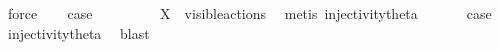 \begin{isabellebody}
\ force\isanewline
\ \ \isamarkupfalse%
\ {\isacharquery}{\kern0pt}case\ \isacommand{{\isachardot}{\kern0pt}{\isachardot}{\kern0pt}}\isamarkupfalse%
\isanewline
{}\isamarkupfalse%
\isanewline
\ \ \isamarkupfalse%
\ {}\isanewline
\ \ \isamarkupfalse%
\ {\isacartoucheopen}X\ {\isasymsubseteq}\ visible{\isacharunderscore}{\kern0pt}actions{\isacartoucheclose}\ \isamarkupfalse%
\ {\isacharparenleft}{\kern0pt}metis\ injectivity{\isacharunderscore}{\kern0pt}theta{\isacharparenleft}{\kern0pt}{}{\isacharparenright}{\kern0pt}{\isacharparenright}{\kern0pt}\isanewline
\ \ \isamarkupfalse%
\ {}\ \isamarkupfalse%
\ {\isacharquery}{\kern0pt}case\ \isamarkupfalse%
\ injectivity{\isacharunderscore}{\kern0pt}theta{\isacharparenleft}{\kern0pt}{}{\isacharparenright}{\kern0pt}\ \isamarkupfalse%
\ blast\isanewline
{}\isamarkupfalse%
%
\endisatagproof
{\isafoldproof}%
%
\isadelimproof
\isanewline
%
\endisadelimproof
\isanewline
{}\isamarkupfalse%
\ %
%
\isadelimtheory
%
\endisadelimtheory
%
\isatagtheory
%
\endisatagtheory
{\isafoldtheory}%
%
\isadelimtheory
%
\endisadelimtheory
%
\end{isabellebody}%
\endinput
